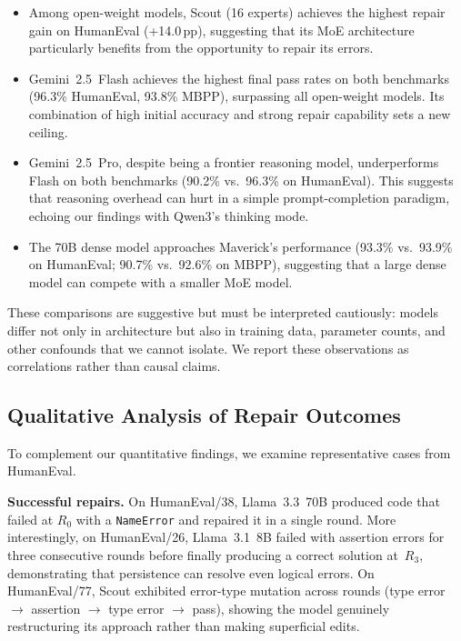 \documentclass[conference]{IEEEtran}
\begin{document}
\begin{itemize}
    \item Among open-weight models, Scout (16 experts) achieves the highest repair gain on HumanEval (+14.0\,pp), suggesting that its MoE architecture particularly benefits from the opportunity to repair its errors.

    \item Gemini~2.5~Flash achieves the highest final pass rates on both benchmarks (96.3\% HumanEval, 93.8\% MBPP), surpassing all open-weight models. Its combination of high initial accuracy and strong repair capability sets a new ceiling.

    \item Gemini~2.5~Pro, despite being a frontier reasoning model, underperforms Flash on both benchmarks (90.2\% vs.\ 96.3\% on HumanEval). This suggests that reasoning overhead can hurt in a simple prompt-completion paradigm, echoing our findings with Qwen3's thinking mode.

    \item The 70B dense model approaches Maverick's performance (93.3\% vs.\ 93.9\% on HumanEval; 90.7\% vs.\ 92.6\% on MBPP), suggesting that a large dense model can compete with a smaller MoE model.
\end{itemize}

These comparisons are suggestive but must be interpreted cautiously: models differ not only in architecture but also in training data, parameter counts, and other confounds that we cannot isolate. We report these observations as correlations rather than causal claims.

\subsection{Qualitative Analysis of Repair Outcomes}

To complement our quantitative findings, we examine representative cases from HumanEval.

\textbf{Successful repairs.} On HumanEval/38, Llama~3.3~70B produced code that failed at $R_0$ with a \texttt{NameError} and repaired it in a single round. More interestingly, on HumanEval/26, Llama~3.1~8B failed with assertion errors for three consecutive rounds before finally producing a correct solution at~$R_3$, demonstrating that persistence can resolve even logical errors. On HumanEval/77, Scout exhibited error-type mutation across rounds (type error $\rightarrow$ assertion $\rightarrow$ type error $\rightarrow$ pass), showing the model genuinely restructuring its approach rather than making superficial edits.
\end{document}
